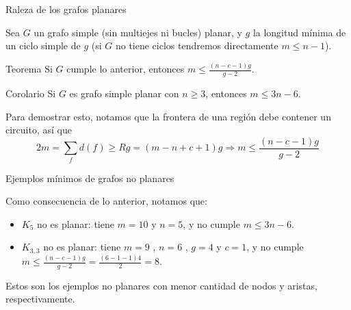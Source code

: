\documentclass[compress]{beamer}
\begin{document}
\begin{frame}{Raleza de los grafos planares}

Sea $G$ un grafo simple (sin multiejes ni bucles) planar, y $g$ la longitud mínima de un ciclo simple de $g$ (si $G$ no tiene ciclos tendremos directamente $m \leq n-1$).

\begin{block}{Teorema}
    Si $G$ cumple lo anterior, entonces $m \leq \frac{(n-c-1)g}{g-2}$.
\end{block}
\begin{block}{Corolario}
    Si $G$ es grafo simple planar con $n \geq 3$, entonces $m \leq 3n - 6$.
\end{block}

Para demostrar esto, notamos que la frontera de una región debe contener un circuito, así que
$$2m = \sum_f {d(f)} \geq R g = (m-n+c+1) g \Rightarrow m \leq \frac{(n-c-1)g}{g-2}$$

\end{frame}



\begin{frame}{Ejemplos mínimos de grafos no planares}

Como consecuencia de lo anterior, notamos que:

\begin{itemize}
    \item $K_5$ no es planar: tiene $m=10$ y $n=5$, y no cumple $m \leq 3n-6$.
    \item $K_{3,3}$ no es planar: tiene $m=9$ , $n=6$ , $g=4$ y $c=1$, y no cumple $m \leq \frac{(n-c-1)g}{g-2} = \frac{(6-1-1)4}{2} = 8$.
\end{itemize}

Estos son los ejemplos no planares con menor cantidad de nodos y aristas, respectivamente.

\end{frame}
\end{document}
